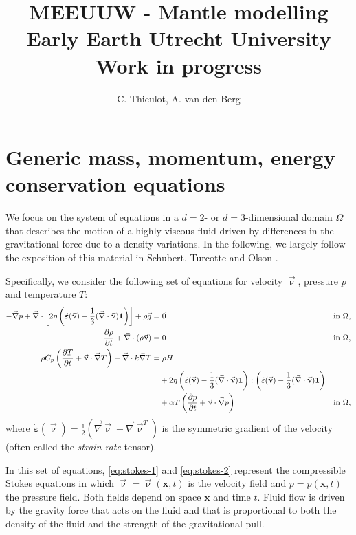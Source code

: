 \documentclass[a4paper]{article}
\title{MEEUUW - Mantle modelling Early Earth Utrecht University Work in progress}
\author{C. Thieulot, A. van den Berg}
\begin{document}
\maketitle

\section{Generic mass, momentum, energy conservation equations}

We focus on the system of equations in a $d=2$- or $d=3$-dimensional
domain $\Omega$ that describes the motion of a highly viscous fluid driven
by differences in the gravitational force due to a density variations. 
In the following, we largely follow the exposition of this
material in Schubert, Turcotte and Olson \cite{scto01}.

Specifically, we consider the following set of equations for 
velocity $\vec\upnu$, pressure $p$ and temperature $T$:
\begin{align}
  \label{eq:stokes-1}
  - \vec\nabla p +  
  \vec\nabla \cdot \left[2\eta \left(\dot{\bm \varepsilon}(\vec \upnu)
                                  - \frac{1}{3}(\vec\nabla \cdot \vec \upnu)\mathbf 1\right)
                \right] +  \rho \vec g &= \vec{0}
  &
  & \textrm{in $\Omega$},
  \\
  \label{eq:stokes-2}
  \frac{\partial \rho}{\partial t} + \vec\nabla \cdot (\rho \vec \upnu) &= 0
  &
  & \textrm{in $\Omega$},
  \\
  \label{eq:temperature}
  \rho C_p \left(\frac{\partial T}{\partial t} + \vec \upnu\cdot\vec\nabla T\right)
  - \vec\nabla\cdot k\vec\nabla T
  &=
  \rho H
  \notag
  \\
  &\quad
  +
  2\eta
  \left(\dot\varepsilon(\vec\upnu) - \frac{1}{3}(\vec\nabla \cdot \vec \upnu)\mathbf 1\right)
  :
  \left(\dot\varepsilon(\vec\upnu) - \frac{1}{3}(\vec\nabla \cdot \vec \upnu)\mathbf 1\right)
  \\
  &\quad
  +\alpha T \left( \frac{\partial p}{\partial t} +  \vec \upnu \cdot \vec\nabla p \right)
  && \textrm{in $\Omega$},
  \notag
\end{align}
where $\dot{\bm \varepsilon}(\vec\upnu) = \frac{1}{2}(\vec\nabla \vec\upnu + \vec\nabla \vec\upnu^T)$
is the symmetric gradient of the velocity (often called the
\textit{strain rate} tensor).

In this set of equations, \eqref{eq:stokes-1} and \eqref{eq:stokes-2}
represent the compressible Stokes equations in which $\vec\upnu =\vec\upnu (\mathbf x,t)$
is the velocity field and $p=p(\mathbf x,t)$ the pressure
field. Both fields depend on space $\mathbf x$ and time $t$. Fluid flow is
driven by the gravity force that acts on the fluid and that is proportional to
both the density of the fluid and the strength of the gravitational pull.
\end{document}
